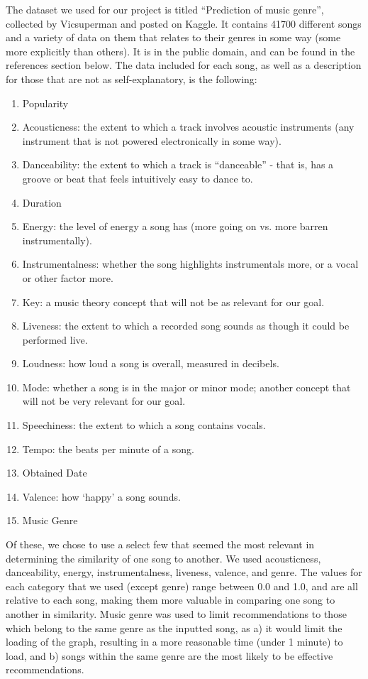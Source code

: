 \documentclass[fontsize=11pt]{article}
\begin{document}
\hspace{\parindent} The dataset we used for our project is titled “Prediction of music genre”, collected by Vicsuperman and posted on Kaggle. It contains 41700 different songs and a variety of data on them that relates to their genres in some way (some more explicitly than others). It is in the public domain, and can be found in the references section below. The data included for each song, as well as a description for those that are not as self-explanatory, is the following:
\begin{enumerate}
\item{Popularity}
\item{Acousticness: the extent to which a track involves acoustic instruments (any instrument that is not powered electronically in some way).}
\item{Danceability: the extent to which a track is “danceable” - that is, has a groove or beat that feels intuitively easy to dance to.}
\item{Duration}
\item{Energy: the level of energy a song has (more going on vs. more barren instrumentally).}
\item{Instrumentalness: whether the song highlights instrumentals more, or a vocal or other factor more.}
\item{Key: a music theory concept that will not be as relevant for our goal.}
\item{Liveness: the extent to which a recorded song sounds as though it could be performed live.}
\item{Loudness: how loud a song is overall, measured in decibels.}
\item{Mode: whether a song is in the major or minor mode; another concept that will not be very relevant for our goal.}
\item{Speechiness: the extent to which a song contains vocals.}
\item{Tempo: the beats per minute of a song.}
\item{Obtained Date}
\item{Valence: how ‘happy’ a song sounds.}
\item{Music Genre}
\end{enumerate}
\hspace{\parindent} Of these, we chose to use a select few that seemed the most relevant in determining the similarity of one song to another. We used acousticness, danceability, energy, instrumentalness, liveness, valence, and genre. The values for each category that we used (except genre) range between 0.0 and 1.0, and are all relative to each song, making them more valuable in comparing one song to another in similarity. Music genre was used to limit recommendations to those which belong to the same genre as the inputted song, as a) it would limit the loading of the graph, resulting in a more reasonable time (under 1 minute) to load, and b) songs within the same genre are the most likely to be effective recommendations.
\end{document}
